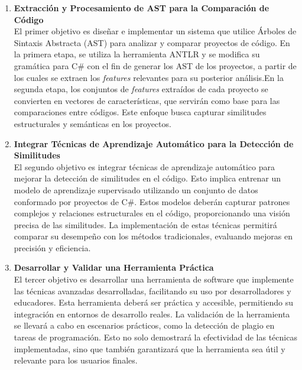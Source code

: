 \renewcommand{\labelenumi}{\Roman{enumi}.}
\begin{enumerate}
	\item {\bf Extracción y Procesamiento de AST para la Comparación de Código}\\
El primer objetivo es diseñar e implementar un sistema que utilice Árboles de Sintaxis Abstracta (AST) para analizar y comparar proyectos de código. En la primera etapa, se utiliza la herramienta ANTLR y se modifica su gramática para C\# con el fin de generar los AST de los proyectos, a partir de los cuales se extraen los \textit{features} relevantes para su posterior análisis.En la segunda etapa, los conjuntos de \textit{features} extraídos de cada proyecto se convierten en vectores de características, que servirán como base para las comparaciones entre códigos. Este enfoque busca capturar similitudes estructurales y semánticas en los proyectos.  
	
	\item {\bf Integrar Técnicas de Aprendizaje Automático para la Detección de Similitudes} \\
El segundo objetivo es integrar técnicas de aprendizaje automático para mejorar la detección de similitudes en el código. Esto implica entrenar un modelo de aprendizaje supervisado utilizando un conjunto de datos conformado por proyectos de C\#. Estos modelos deberán capturar patrones complejos y relaciones estructurales en el código, proporcionando una visión precisa de las similitudes. La implementación de estas técnicas permitirá comparar su desempeño con los métodos tradicionales, evaluando mejoras en precisión y eficiencia.

	\item {\bf Desarrollar y Validar una Herramienta Práctica} \\
El tercer objetivo es desarrollar una herramienta de software que implemente las técnicas avanzadas desarrolladas, facilitando su uso por desarrolladores y educadores. Esta herramienta deberá ser práctica y accesible, permitiendo su integración en entornos de desarrollo reales. La validación de la herramienta se llevará a cabo en escenarios prácticos, como la detección de plagio en tareas de programación. Esto no solo demostrará la efectividad de las técnicas implementadas, sino que también garantizará que la herramienta sea útil y relevante para los usuarios finales.


\end{enumerate}

